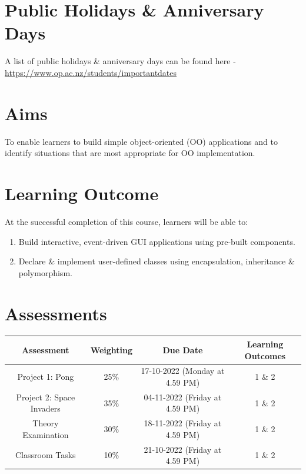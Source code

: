 \documentclass{article}
\begin{document}
\section*{Public Holidays \& Anniversary Days}
A list of public holidays \& anniversary days can be found here - \href{https://www.op.ac.nz/students/importantdates}{https://www.op.ac.nz/students/importantdates}

\section*{Aims}
To enable learners to build simple object-oriented (OO) applications and to identify situations that are most appropriate for OO implementation.

\section*{Learning Outcome}
At the successful completion of this course, learners will be able to:
\begin{enumerate}
	\item Build interactive, event-driven GUI applications using pre-built components.
	\item Declare \& implement user-defined classes using encapsulation, inheritance \& polymorphism.
\end{enumerate}

\section*{Assessments}
\renewcommand{\arraystretch}{1.5}
\begin{tabular}{|c|c|c|c|}
	\hline
	\textbf{Assessment}                                 & \textbf{Weighting} & \textbf{Due Date}            & \textbf{Learning Outcomes} \\ \hline
	\small Project 1: Pong & \small 25\%        & \small 17-10-2022 (Monday at 4.59 PM)   & \small 1 \& 2                   \\ \hline
	\small Project 2: Space Invaders & \small 35\%        & \small 04-11-2022 (Friday at 4.59 PM)   & \small 1 \& 2                   \\ \hline
	\small Theory Examination                        & \small 30\%        & \small 18-11-2022 (Friday at 4.59 PM)  & \small 1 \& 2                   \\ \hline
	\small Classroom Tasks                       & \small 10\%        & \small 21-10-2022 (Friday at 4.59 PM)  & \small 1 \& 2                   \\ \hline
\end{tabular}
\end{document}
